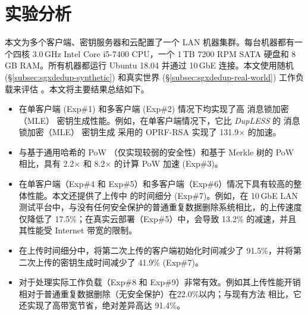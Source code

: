 \section{实验分析}
\label{sec:sgxdedup-evaluation}

本文为多个客户端、密钥服务器和云配置了一个 LAN 机器集群。每台机器都有一个四核 3.0\,GHz Intel Core i5-7400 CPU，一个 1\,TB 7200 RPM SATA 硬盘和 8\,GB RAM。所有机器都运行 Ubuntu 18.04 并通过 10\,GbE 连接。本文使用随机 (\S\ref{subsec:sgxdedup-synthetic}) 和真实世界 (\S\ref{subsec:sgxdedup-real-world}) 工作负载来评估 \sysnameS。本文将主要结果总结如下。

\begin{itemize}[leftmargin=*]
\item \sysnameS 在单客户端 (Exp\#1) 和多客户端 (Exp\#2) 情况下均实现了高 消息锁加密（MLE） 密钥生成性能。例如，在单客户端情况下，它比 {\em DupLESS} 的 消息锁加密（MLE） 密钥生成 \cite{bellare2013DupLESS} 采用的 OPRF-RSA 实现了 131.9$\times$ 的加速。
\item \sysnameS 与基于通用哈希的 PoW \cite{xu2013weak}（仅实现较弱的安全性）和基于 Merkle 树的 PoW \cite{halevi11} 相比，具有 2.2$\times$ 和 8.2$\times$ 的计算 PoW 加速 (Exp\#3)。
\item \sysnameS 在单客户端（Exp\#4 和 Exp\#5）和多客户端（Exp\#6）情况下具有较高的整体性能。本文还提供了上传中 \sysnameS 的时间细分 (Exp\#7)。例如，在 10\,GbE LAN 测试平台中，与没有任何安全保护的普通重复数据删除系统相比，\sysnameS 的上传速度仅降低了 17.5\%；在真实云部署（Exp\#5）中，\sysnameS 会导致 13.2\% 的减速，并且其性能受 Internet 带宽的限制。
\item 在上传时间细分中，\sysnameS 将第二次上传的客户端初始化时间减少了 91.5\%，并将第二次上传的密钥生成时间减少了 41.9\% (Exp\#7)。
\item \sysnameS 对于处理实际工作负载（Exp\#8 和 Exp\#9）非常有效。例如其上传性能开销相对于普通重复数据删除（无安全保护）在22.0\%以内；与现有方法 \cite{li15,harnik2010side} 相比，它还实现了高带宽节省，绝对差异高达 91.4\%。
\end{itemize}



